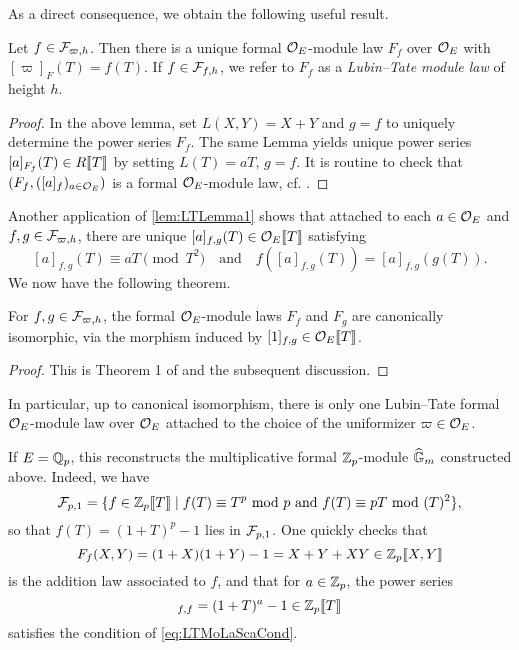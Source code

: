 \documentclass[../main.tex]{subfiles}
\begin{document}
As a direct consequence, we obtain the following useful result.
\begin{deflem} 
  Let $f \in \mathcal{F}_{\varpi, h}$. Then there is a unique formal ${\mathcal{O}_E}$-module
  law $F_f$ over ${\mathcal{O}_E}$ with $[\varpi]_F(T) = f(T)$. 
  If $f \in \mathcal{F}_{f, h}$, we refer to $F_f$ as a \emph{Lubin--Tate module law} of height $h$.
\begin{proof}
  In the above lemma, set $L(X,Y) = X+Y$ and $g=f$ to uniquely determine 
  the power series $F_f$. The same Lemma yields unique power series
  $[a]_{F_f}(T) \in R\llbracket T \rrbracket$ by setting $L(T) = a T$, $g=f$. It is
  routine to check that $(F_f, ([a]_f)_{a \in {\mathcal{O}_E}})$ is a formal
  ${\mathcal{O}_E}$-module law, cf. \cite{LubinTateFormalMult}.
\end{proof}
\end{deflem}

Another application of \cref{lem:LTLemma1} shows that attached to each $a \in
\mathcal{O}_E$ and $f,g \in \mathcal{F}_{\varpi,h}$, there are unique $[a]_{f,g}(T) \in
\mathcal{O}_E\llbracket T \rrbracket$ satisfying
\begin{equation}\label{eq:LTMoLaScaCond}
  [a]_{f,g}(T) \equiv aT \pmod {T^2} \quad \text{and} \quad
  f([a]_{f,g}(T)) = [a]_{f,g}(g(T)).
\end{equation}
We now have the following theorem.
\begin{thm}\label{thm:LTModLaw}
  For $f,g \in \mathcal{F}_{\varpi,h}$, the formal $\mathcal{O}_E$-module laws $F_f$ and $F_g$ are
  canonically isomorphic, via the morphism induced by $[1]_{f,g} \in \mathcal{O}_E\llbracket
  T \rrbracket$. 
\begin{proof}
  This is Theorem 1 of \cite{LubinTateFormalMult} and the subsequent discussion.
\end{proof}
\end{thm}
In particular, up to canonical isomorphism, there is only one Lubin--Tate formal
$\mathcal{O}_E$-module law over $\mathcal{O}_E$ attached to the choice of the uniformizer $\varpi \in
\mathcal{O}_E$. 

\begin{xpl}
  If $E = \mathbb{Q}_p$, this reconstructs the multiplicative formal 
  $\mathbb{Z}_p$-module $\widehat{\mathbb{G}}_m$ constructed above. Indeed, we have 
  \begin{equation*}
    \mathcal{F}_{p,1} = \{f \in \mathbb{Z}_p\llbracket T \rrbracket \mid f(T) \equiv T^p \text{ mod } p
    \text{ and } f(T) \equiv pT \text{ mod } (T)^2 \},
  \end{equation*}
  so that $f(T) = (1+T)^p-1$ lies in $\mathcal{F}_{p,1}$.  
  One quickly checks that 
  \begin{equation*}
    F_f(X,Y) = (1+X)(1+Y) - 1 = X + Y + XY \in \mathbb{Z}_p \llbracket X,Y \rrbracket
  \end{equation*}
  is the addition law associated to $f$, and that 
  for $a \in \mathbb{Z}_p$, the power series
  \begin{equation*}
    [a]_{f,f} = (1+T)^{a} - 1 \in \Z_p \llbr T \rrbr
  \end{equation*}
  satisfies the condition of \eqref{eq:LTMoLaScaCond}. 
\end{xpl}
\end{document}
